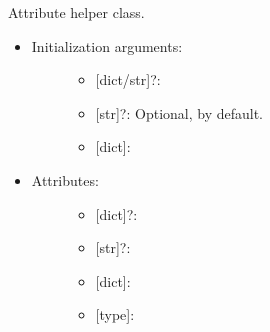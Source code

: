\documentclass[letterpaper,10pt,english]{sphinxmanual}
\begin{document}
\begin{fulllineitems}
\begin{fulllineitems}
\begin{quote}
\begin{description}
\end{description}\end{quote}

\end{fulllineitems}


\end{fulllineitems}


\begin{fulllineitems}
\label{\detokenize{reference:pypath.main.AttrHelper}}
Attribute helper class.
\begin{itemize}
\item {} \begin{description}
\item[{Initialization arguments:}] \leavevmode\begin{itemize}
\item {} 
 {[}dict/str{]}?:

\item {} 
 {[}str{]}?: Optional,  by default.

\item {} 
 {[}dict{]}:

\end{itemize}

\end{description}

\item {} \begin{description}
\item[{Attributes:}] \leavevmode\begin{itemize}
\item {} 
 {[}dict{]}?:

\item {} 
 {[}str{]}?:

\item {} 
 {[}dict{]}:

\item {} 
 {[}type{]}:

\end{itemize}


\end{description}
\end{itemize}
\end{fulllineitems}
\end{document}

